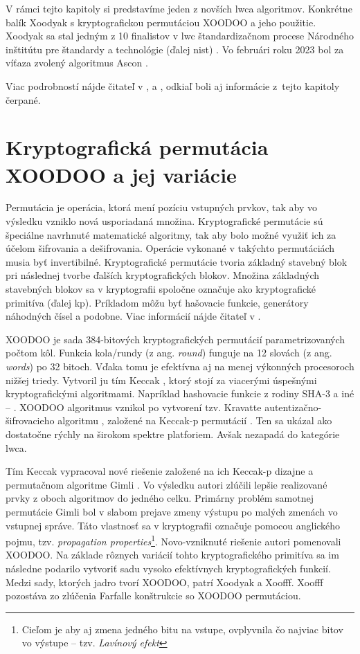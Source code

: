 V rámci tejto kapitoly si predstavíme jeden z novších \acrshort{lwca} algoritmov. Konkrétne balík Xoodyak s kryptografickou permutáciou XOODOO \cite{tkecak} a jeho použitie. Xoodyak sa stal jedným z 10 finalistov v \acrshort{lwc} štandardizačnom procese Národného inštitútu pre štandardy a technológie (ďalej \acrshort{nist}) \cite{lwc3}. Vo februári roku 2023 bol za víťaza zvolený algoritmus Ascon \cite{ascon}.

Viac podrobností nájde čitateľ v \cite{lwc}, \cite{lwc2} a \cite{lwc3}, odkiaľ boli aj informácie z~tejto kapitoly čerpané. 
        
\section{Kryptografická permutácia XOODOO a jej variácie}
Permutácia je operácia, ktorá mení pozíciu vstupných prvkov, tak aby vo výsledku vzniklo nová usporiadaná množina. Kryptografické permutácie sú špeciálne navrhnuté matematické algoritmy, tak aby bolo možné využiť ich za účelom šifrovania a dešifrovania. Operácie vykonané v takýchto permutáciách musia byť invertibilné. Kryptografické permutácie tvoria základný stavebný blok pri následnej tvorbe ďalších kryptografických blokov. Množina základných stavebných blokov sa v kryptografii spoločne označuje ako kryptografické primitíva (ďalej \acrshort{kp}). Príkladom môžu byť hašovacie funkcie, generátory náhodných čísel a podobne. Viac informácií nájde čitateľ v \cite{kp}.  
 
XOODOO je sada 384-bitových kryptografických permutácií parametrizovaných počtom kôl. Funkcia kola/rundy (z ang. \textit{round}) funguje na 12 slovách (z ang. \textit{words}) po 32 bitoch. Vďaka tomu je efektívna aj na menej výkonných procesoroch nižšej triedy. Vytvoril ju tím Keccak \cite{kecak}, ktorý stojí za viacerými úspešnými kryptografickými algoritmami. Napríklad hashovacie funkcie z rodiny SHA-3 a iné -- \cite{kecsup}. XOODOO algoritmus vznikol po vytvorení tzv. Kravatte autentizačno-šifrovacieho algoritmu \cite{kravatte}, založené na Keccak-p permutácií \cite{keccakp}. Ten sa ukázal ako dostatočne rýchly na širokom spektre platforiem. Avšak nezapadá do kategórie \acrshort{lwca}.

Tím Keccak vypracoval nové riešenie založené na ich Keccak-p dizajne a permutačnom algoritme Gimli \cite{bernstein2017gimli}. Vo výsledku autori zlúčili lepšie realizované prvky z oboch algoritmov do jedného celku. Primárny problém samotnej permutácie Gimli bol v slabom prejave zmeny výstupu po malých zmenách vo vstupnej správe. Táto vlastnosť sa v kryptografii označuje pomocou anglického pojmu, tzv. \textit{propagation properties}\footnote{Cieľom je aby aj zmena jedného bitu na vstupe, ovplyvnila čo najviac bitov vo výstupe -- tzv. \textit{Lavínový efekt}}. Novo-vzniknuté riešenie autori pomenovali XOODOO. Na základe rôznych variácií tohto kryptografického primitíva sa im následne podarilo vytvoriť sadu vysoko efektívnych kryptografických funkcií. 
Medzi sady, ktorých jadro tvorí XOODOO, patrí Xoodyak a Xoofff. Xoofff pozostáva zo zlúčenia Farfalle konštrukcie \cite{farfalle} so XOODOO permutáciou. 

